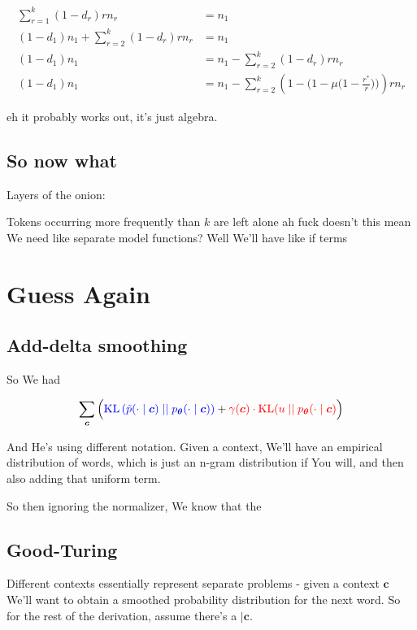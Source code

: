 \documentclass{article}
\newcommand{\KL}{\mathrm{KL}}
\newcommand{\uniform}{u}
\newcommand{\vtheta}{\boldsymbol{\theta}}
\newcommand{\model}{p_{\vtheta}}
\newcommand{\context}{\boldsymbol{c}}
\begin{document}
		\begin{align}
			\sum^k_{r=1} (1-d_r) r n_r &= n_1\\
			(1-d_1)  n_1 + \sum^k_{r=2} (1-d_r) r n_r &= n_1\\
			(1-d_1)  n_1  &= n_1 - \sum^k_{r=2} (1-d_r) r n_r\\
			(1-d_1)  n_1  &= n_1 - \sum^k_{r=2} (1-\bigg( 1-\mu\bigg(1-\frac{r^*}{r} \bigg)\bigg)) r n_r
		\end{align}
		
		eh it probably works out, it's just algebra. 
		
	\subsection{So now what}
	
		Layers of the onion:
		
		Tokens occurring more frequently than $k$ are left alone ah fuck doesn't this mean We need like separate model functions? Well We'll have like if terms
		

\newpage		
\section{Guess Again}

	\subsection{Add-delta smoothing}
		
		So We had
		
		\begin{align}
	  		\sum_{\context} \Big( {\color{blue} \KL\left(\tilde{p}(\cdot 			\mid \context) \mid\mid \model(\cdot \mid \context)					\right)} + {\color{red}\gamma(\context) \cdot 						\KL(\uniform \mid\mid \model(\cdot \mid \context)}\Big)
		\end{align}
		
		And He's using different notation. Given a context, We'll have an empirical distribution of words, which is just an n-gram distribution if You will, and then also adding that uniform term.
		
		So then ignoring the normalizer, We know that the 
		
	\subsection{Good-Turing}
	
		Different contexts essentially represent separate problems - given a context $\context$ We'll want to obtain a smoothed probability distribution for the next word. So for the rest of the derivation, assume there's a $|\context$. 
		
\end{document}
